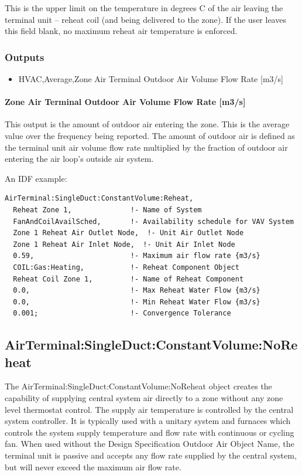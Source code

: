 This is the upper limit on the temperature in degrees C of the air leaving the terminal unit -- reheat coil (and being delivered to the zone). If the user leaves this field blank, no maximum reheat air temperature is enforced.

\subsubsection{Outputs}

\begin{itemize}
\item
  HVAC,Average,Zone Air Terminal Outdoor Air Volume Flow Rate {[}m3/s{]}
\end{itemize}

\paragraph{Zone Air Terminal Outdoor Air Volume Flow Rate {[}m3/s{]}}\label{zone-air-terminal-outdoor-air-volume-flow-rate-m3s}

This output is the amount of outdoor air entering the zone. This is the average value over the frequency being reported. The amount of outdoor air is defined as the terminal unit air volume flow rate multiplied by the fraction of outdoor air entering the air loop's outside air system.

An IDF example:

\begin{lstlisting}
AirTerminal:SingleDuct:ConstantVolume:Reheat,
  Reheat Zone 1,              !- Name of System
  FanAndCoilAvailSched,       !- Availability schedule for VAV System
  Zone 1 Reheat Air Outlet Node,  !- Unit Air Outlet Node
  Zone 1 Reheat Air Inlet Node,  !- Unit Air Inlet Node
  0.59,                       !- Maximum air flow rate {m3/s}
  COIL:Gas:Heating,           !- Reheat Component Object
  Reheat Coil Zone 1,         !- Name of Reheat Component
  0.0,                        !- Max Reheat Water Flow {m3/s}
  0.0,                        !- Min Reheat Water Flow {m3/s}
  0.001;                      !- Convergence Tolerance
\end{lstlisting}

\subsection{AirTerminal:SingleDuct:ConstantVolume:NoReheat}\label{airterminalsingleductconstantvolumenoreheat}
The AirTerminal:SingleDuct:ConstantVolume:NoReheat object creates the capability of supplying central system air directly to a zone without any zone level thermostat control. The supply air temperature is controlled by the central system controller. It is typically used with a unitary system and furnaces which controls the system supply temperature and flow rate with continuous or cycling fan. When used without the Design Specification Outdoor Air Object Name, the terminal unit is passive and accepts any flow rate supplied by the central system, but will never exceed the maximum air flow rate.

